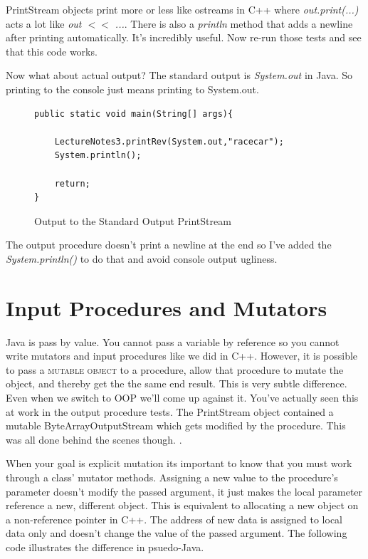 \documentclass[]{tufte-handout}
\begin{document}
PrintStream objects print more or less like ostreams in C++ where \textit{out.print(...)} acts a lot like \textit{out $<<$ ...}. There is also a \textit{println} method that adds a newline after printing automatically. It's incredibly useful. Now re-run those tests and see that this code works.

Now what about actual output? The standard output is \textit{System.out} in Java. So printing to the console just means printing to System.out.

\begin{figure}
\begin{lstlisting}
public static void main(String[] args){
	
	LectureNotes3.printRev(System.out,"racecar");
	System.println();
	
	return;
}	
\end{lstlisting}
\label{fig:consoleOutput}
\caption{Output to the Standard Output PrintStream}
\end{figure}

The output procedure doesn't print a newline at the end so I've added the \textit{	System.println() } to do that and avoid console output ugliness.

\section{Input Procedures and Mutators}

Java is pass by value. You cannot pass a variable by reference so you cannot write mutators and input procedures like we did in C++. However, it is possible to pass a \textsc{mutable object} to a procedure, allow that procedure to mutate the object, and thereby get the the same end result. This is very subtle difference. Even when we switch to OOP we'll come up against it. You've actually seen this at work in the output procedure tests. The PrintStream object contained a mutable ByteArrayOutputStream which gets modified by the procedure. This was all done behind the scenes though. 
.

When your goal is explicit mutation its important to know that you must work through a class' mutator methods. Assigning a new value to the procedure's parameter doesn't modify the passed argument, it just makes the local parameter reference a new, different object. This is equivalent to allocating a new object on a non-reference pointer in C++. The address of new data is assigned to local data only and doesn't change the value of the passed argument. The following code illustrates the difference in psuedo-Java. 
\end{document}
